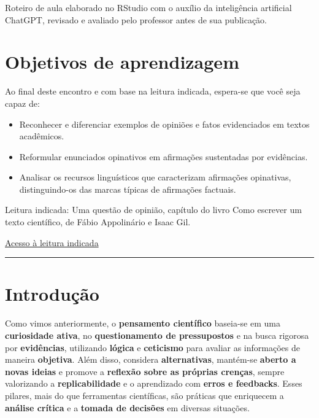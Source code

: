 \documentclass[
  letterpaper,
  DIV=11,
  numbers=noendperiod]{scrreprt}
\begin{document}
Roteiro de aula elaborado no RStudio com o auxílio da inteligência
artificial ChatGPT, revisado e avaliado pelo professor antes de sua
publicação.

\section{Objetivos de aprendizagem}\label{objetivos-de-aprendizagem-1}

Ao final deste encontro e com base na leitura indicada, espera-se que
você seja capaz de:

\begin{itemize}
\item
  Reconhecer e diferenciar exemplos de opiniões e fatos evidenciados em
  textos acadêmicos.
\item
  Reformular enunciados opinativos em afirmações sustentadas por
  evidências.
\item
  Analisar os recursos linguísticos que caracterizam afirmações
  opinativas, distinguindo-os das marcas típicas de afirmações factuais.
\end{itemize}

Leitura indicada: Uma questão de opinião, capítulo do livro Como
escrever um texto científico, de Fábio Appolinário e Isaac Gil.

\href{vbk://9788599519493/page/11}{Acesso à leitura indicada}

\begin{center}\rule{0.5\linewidth}{0.5pt}\end{center}

\section{Introdução}\label{introduuxe7uxe3o}

Como vimos anteriormente, o \textbf{pensamento científico} baseia-se em
uma \textbf{curiosidade ativa}, no \textbf{questionamento de
pressupostos} e na busca rigorosa por \textbf{evidências}, utilizando
\textbf{lógica} e \textbf{ceticismo} para avaliar as informações de
maneira \textbf{objetiva}. Além disso, considera \textbf{alternativas},
mantém-se \textbf{aberto a novas ideias} e promove a \textbf{reflexão
sobre as próprias crenças}, sempre valorizando a
\textbf{replicabilidade} e o aprendizado com \textbf{erros e feedbacks}.
Esses pilares, mais do que ferramentas científicas, são práticas que
enriquecem a \textbf{análise crítica} e a \textbf{tomada de decisões} em
diversas situações.
\end{document}
